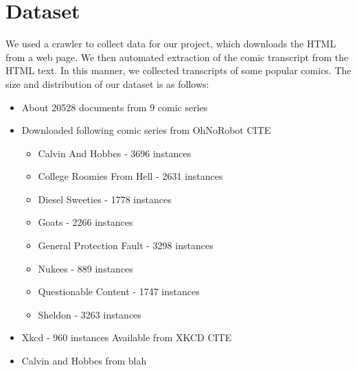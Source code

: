 \documentclass[11pt,twocolumn]{article}
\begin{document}
\section{Dataset}
We used a crawler to collect data for our project, which downloads the HTML from a web page. We then automated extraction of the comic transcript from the HTML text. In this manner, we collected transcripts of some popular comics. The size and distribution of our dataset is as follows:
\begin{itemize}
\item
  About 20528 documents from 9 comic series
\item
  Downloaded following comic series from OhNoRobot CITE
\begin{itemize}
\item
  Calvin And Hobbes - 3696 instances
\item
  College Roomies From Hell - 2631 instances
\item
  Diesel Sweeties - 1778 instances
\item
  Goats - 2266 instances
\item
  General Protection Fault - 3298 instances
\item
  Nukees - 889 instances
\item
  Questionable Content -  1747 instances
\item
  Sheldon - 3263 instances
  \end{itemize}
\item
Xkcd - 960 instances
Available from XKCD CITE
\item
  Calvin and Hobbes from blah
\end{itemize}
\end{document}
